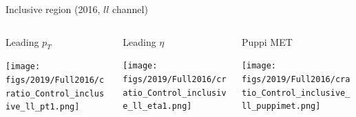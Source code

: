 \documentclass[9pt]{beamer}
\begin{document}
\begin{frame}{Inclusive region (2016, $ll$ channel)}
\justifying
\begin{columns}
		\hspace{5pt}
		\begin{column}{0.32\textwidth}
			\begin{center}
				\begin{block}{\centering Leading $p_T$}\end{block}	
     			\texttt{[image: figs/2019/Full2016/cratio\_Control\_inclusive\_ll\_pt1.png]}
    		\end{center}		
		\end{column} \hfill
		\begin{column}{0.32\textwidth}
			\begin{center}
				\begin{block}{\centering Leading $\eta$}\end{block}	
     			\texttt{[image: figs/2019/Full2016/cratio\_Control\_inclusive\_ll\_eta1.png]}
    		\end{center}		
		\end{column} \hfill
		\begin{column}{0.32\textwidth}
			\begin{center}
				\begin{block}{\centering Puppi MET}\end{block}	
     			\texttt{[image: figs/2019/Full2016/cratio\_Control\_inclusive\_ll\_puppimet.png]}
   			 \end{center}
		\end{column} \hfill
	\end{columns} \vspace{-5pt}
	\begin{columns}
		\hspace{5pt}

\end{columns}
\end{frame}
\end{document}
